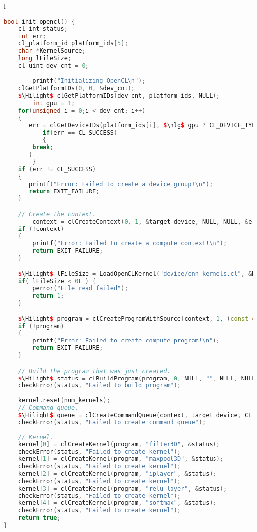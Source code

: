 \begin{table}[!h]
\centering
\caption{Initialization of OpenCL Objects for a GPU Device}
\label{cnncode4:gpu-opencl-init}
\begin{tabular}{l}
\toprule
\begin{lstlisting}[columns=fullflexible, language=C++,escapechar=\$]
bool init_opencl() {
	cl_int status;
	int err;
	cl_platform_id platform_ids[5];		
	char *KernelSource;
	long lFileSize;
	cl_uint dev_cnt = 0;

        printf("Initializing OpenCL\n");
	clGetPlatformIDs(0, 0, &dev_cnt);
	$\Hilight$ clGetPlatformIDs(dev_cnt, platform_ids, NULL);
        int gpu = 1;
	for(unsigned i = 0;i < dev_cnt; i++)
	{
	   err = clGetDeviceIDs(platform_ids[i], $\hlg$ gpu ? CL_DEVICE_TYPE_GPU:CL_DEVICE_TYPE_CPU, 1, &target_device, NULL);
           if(err == CL_SUCCESS)
           {
		break;
	   }
        }
	if (err != CL_SUCCESS)
	{
	   printf("Error: Failed to create a device group!\n");
	   return EXIT_FAILURE;
   	}

	// Create the context.
        context = clCreateContext(0, 1, &target_device, NULL, NULL, &err);
	if (!context)
	{
	    printf("Error: Failed to create a compute context!\n");
	    return EXIT_FAILURE;
	}

	$\Hilight$ lFileSize = LoadOpenCLKernel("device/cnn_kernels.cl", &KernelSource);
	if( lFileSize < 0L ) {
		perror("File read failed");
		return 1;
	}

	$\Hilight$ program = clCreateProgramWithSource(context, 1, (const char **) & KernelSource, NULL, &err);
	if (!program)
	{
		printf("Error: Failed to create compute program!\n");
		return EXIT_FAILURE;
	}

	// Build the program that was just created.
	$\Hilight$ status = clBuildProgram(program, 0, NULL, "", NULL, NULL);
	checkError(status, "Failed to build program");
	
	kernel.reset(num_kernels);
	// Command queue.
	$\Hilight$ queue = clCreateCommandQueue(context, target_device, CL_QUEUE_PROFILING_ENABLE, &status); 
	checkError(status, "Failed to create command queue");
	
	// Kernel.
	kernel[0] = clCreateKernel(program, "filter3D", &status);
	checkError(status, "Failed to create kernel");
	kernel[1] = clCreateKernel(program, "maxpool3D", &status);
	checkError(status, "Failed to create kernel");
	kernel[2] = clCreateKernel(program, "iplayer", &status);
	checkError(status, "Failed to create kernel");
	kernel[3] = clCreateKernel(program, "relu_layer", &status);
	checkError(status, "Failed to create kernel");
	kernel[4] = clCreateKernel(program, "softmax", &status);
	checkError(status, "Failed to create kernel");
	return true;
}
\end{lstlisting}
\\
\bottomrule
\end{tabular}
\end{table}